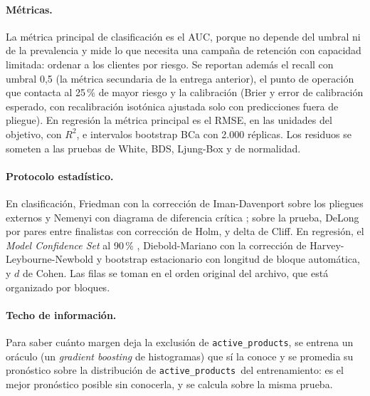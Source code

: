 \documentclass[pdflatex,sn-mathphys-num]{sn-jnl}
\newcommand{\ap}{\texttt{active\_products}}
\begin{document}
\paragraph{Métricas.}
La métrica principal de clasificación es el AUC, porque no depende del umbral ni de la prevalencia y mide lo que necesita una campaña de retención con capacidad limitada: ordenar a los clientes por riesgo. Se reportan además el recall con umbral 0,5 (la métrica secundaria de la entrega anterior), el punto de operación que contacta al 25\,\% de mayor riesgo y la calibración (Brier y error de calibración esperado, con recalibración isotónica ajustada solo con predicciones fuera de pliegue). En regresión la métrica principal es el RMSE, en las unidades del objetivo, con $R^2$, e intervalos bootstrap BCa con 2.000 réplicas. Los residuos se someten a las pruebas de White, BDS, Ljung-Box y de normalidad.

\paragraph{Protocolo estadístico.}
En clasificación, Friedman con la corrección de Iman-Davenport sobre los pliegues externos y Nemenyi con diagrama de diferencia crítica \cite{demsar2006}; sobre la prueba, DeLong \cite{delong1988} por pares entre finalistas con corrección de Holm, y delta de Cliff. En regresión, el \textit{Model Confidence Set} al 90\,\% \cite{hansen2011mcs}, Diebold-Mariano \cite{diebold1995} con la corrección de Harvey-Leybourne-Newbold y bootstrap estacionario con longitud de bloque automática, y $d$ de Cohen. Las filas se toman en el orden original del archivo, que está organizado por bloques.

\paragraph{Techo de información.}
Para saber cuánto margen deja la exclusión de \ap, se entrena un oráculo (un \textit{gradient boosting} de histogramas) que sí la conoce y se promedia su pronóstico sobre la distribución de \ap\ del entrenamiento: es el mejor pronóstico posible sin conocerla, y se calcula sobre la misma prueba.
\end{document}
